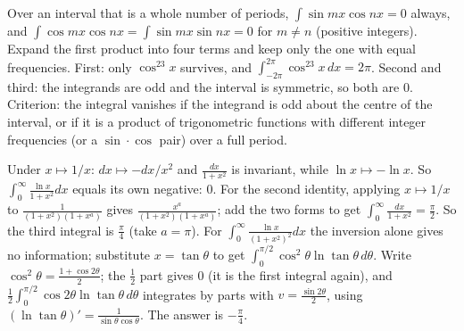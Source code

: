 \documentclass[11pt,a4paper]{article}
\begin{document}
Over an interval that is a whole number of periods, \(\int\sin mx\cos nx=0\) always, and \(\int\cos mx\cos nx=\int\sin mx\sin nx=0\) for \(m\ne n\) (positive integers). Expand the first product into four terms and keep only the one with equal frequencies.
First: only \(\cos^23x\) survives, and \(\int_{-2\pi}^{2\pi}\cos^23x\,dx=2\pi\). Second and third: the integrands are odd and the interval is symmetric, so both are \(0\). Criterion: the integral vanishes if the integrand is odd about the centre of the interval, or if it is a product of trigonometric functions with different integer frequencies (or a \(\sin\cdot\cos\) pair) over a full period.

Under \(x\mapsto1/x\): \(dx\mapsto -dx/x^2\) and \(\frac{dx}{1+x^2}\) is invariant, while \(\ln x\mapsto-\ln x\). So \(\int_0^\infty\frac{\ln x}{1+x^2}dx\) equals its own negative: \(0\). For the second identity, applying \(x\mapsto 1/x\) to \(\frac{1}{(1+x^2)(1+x^a)}\) gives \(\frac{x^a}{(1+x^2)(1+x^a)}\); add the two forms to get \(\int_0^\infty\frac{dx}{1+x^2}=\frac\pi2\).
So the third integral is \(\frac\pi4\) (take \(a=\pi\)). For \(\int_0^\infty\frac{\ln x}{(1+x^2)^2}dx\) the inversion alone gives no information; substitute \(x=\tan\theta\) to get \(\int_0^{\pi/2}\cos^2\theta\ln\tan\theta\,d\theta\).
Write \(\cos^2\theta=\frac{1+\cos2\theta}2\); the \(\frac12\) part gives \(0\) (it is the first integral again), and \(\frac12\int_0^{\pi/2}\cos2\theta\ln\tan\theta\,d\theta\) integrates by parts with \(v=\frac{\sin2\theta}2\), using \((\ln\tan\theta)'=\frac1{\sin\theta\cos\theta}\). The answer is \(-\frac\pi4\).
\end{document}
